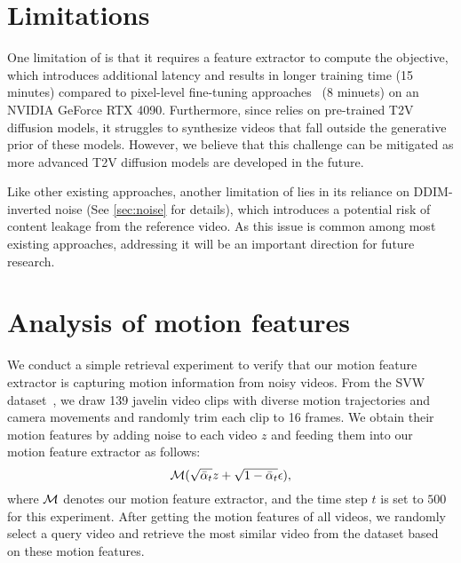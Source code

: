 \section{Limitations}
\label{sec:limitations}

One limitation of {\ours} is that it requires a feature extractor to compute the objective, which introduces additional latency and results in longer training time (15 minutes) compared to pixel-level fine-tuning approaches~\cite{md,vmc} (8 minuets) on an NVIDIA GeForce RTX 4090. Furthermore, since {\ours} relies on pre-trained T2V diffusion models, it struggles to synthesize videos that fall outside the generative prior of these models. However, we believe that this challenge can be mitigated as more advanced T2V diffusion models are developed in the future.

Like other existing approaches, another limitation of {\ours} lies in its reliance on DDIM-inverted noise (See \cref{sec:noise} for details), which introduces a potential risk of content leakage from the reference video. As this issue is common among most existing approaches, addressing it will be an important direction for future research.

\section{Analysis of motion features}
\label{sec:supp_retrieval}

We conduct a simple retrieval experiment to verify that our motion feature extractor is capturing motion information from noisy videos. From the SVW dataset~\cite{svw}, we draw 139 javelin video clips with diverse motion trajectories and camera movements and randomly trim each clip to 16 frames. We obtain their motion features by adding noise to each video $z$ and feeding them into our motion feature extractor as follows:
\begin{equation}
\mathcal {{\mathcal M}}(\sqrt{\bar{\alpha}_t}z+\sqrt{1-\bar{\alpha}_t}\epsilon)
\label{eq:retrieval},
\end{equation}
where ${\mathcal M}$ denotes our motion feature extractor, and the time step $t$ is set to $500$ for this experiment. After getting the motion features of all videos, we randomly select a query video and retrieve the most similar video from the dataset based on these motion features.

